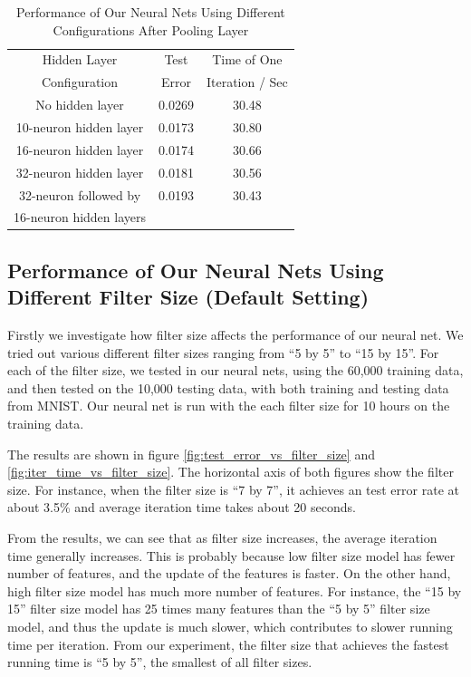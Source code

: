 \documentclass[10pt,twocolumn]{article}
\begin{document}
\begin{table}
\begin{center}
\begin{tabular}{| c | c | c |}
\hline
Hidden Layer & Test & Time of One\\
Configuration & Error & Iteration / Sec \\
\hline
No hidden layer & 0.0269 & 30.48\\ \hline
10-neuron hidden layer & 0.0173 & 30.80\\ \hline
16-neuron hidden layer & 0.0174 & 30.66\\ \hline
32-neuron hidden layer & 0.0181 & 30.56\\ \hline
32-neuron followed by & 0.0193 & 30.43\\
16-neuron hidden layers & &\\ \hline
\hline
\end{tabular}
\end{center}
\label{table:change_in_neurons_in_hidden_layer}
\caption{Performance of Our Neural Nets Using Different Configurations After Pooling Layer}
\end{table}

\subsection{Performance of Our Neural Nets Using Different Filter Size (Default Setting)}

Firstly we investigate how filter size affects the performance of our neural net. We tried out various different filter sizes ranging from ``5 by 5'' to ``15 by 15''. For each of the filter size, we tested in our neural nets, using the 60,000 training data, and then tested on the 10,000 testing data, with both training and testing data from MNIST. Our neural net is run with the each filter size for 10 hours on the training data.

The results are shown in figure \ref{fig:test_error_vs_filter_size} and \ref{fig:iter_time_vs_filter_size}. The horizontal axis of both figures show the filter size. For instance, when the filter size is ``7 by 7'', it achieves an test error rate at about 3.5\% and average iteration time takes about 20 seconds.

From the results, we can see that as filter size increases, the average iteration time generally increases. This is probably because low filter size model has fewer number of features, and the update of the features is faster. On the other hand, high filter size model has much more number of features. For instance, the ``15 by 15'' filter size model has 25 times many features than the ``5 by 5'' filter size model, and thus the update is much slower, which contributes to slower running time per iteration. From our experiment, the filter size that achieves the fastest running time is ``5 by 5'', the smallest of all filter sizes.
\end{document}
